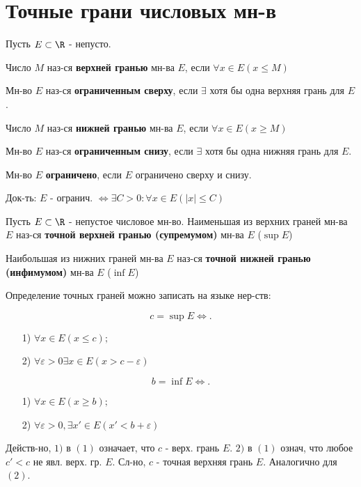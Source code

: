 \section{Точные грани числовых мн-в}
\begin{definition}
Пусть $E \subset \R$ - непусто.

Число $M$ наз-ся \textbf{верхней гранью} мн-ва $E$, если $\forall x \in E (x \leq M)$

Мн-во $E$ наз-ся \textbf{ограниченным сверху}, если $\exists $ хотя бы одна верхняя грань для $E$.

Число $M$ наз-ся \textbf{нижней гранью} мн-ва $E$, если $\forall x \in E (x \geq M)$

Мн-во $E$ наз-ся \textbf{ограниченным снизу}, если $\exists $ хотя бы одна нижняя грань для $E$.

Мн-во $E$ \textbf{ограничено}, если $E$ ограничено сверху и снизу.
\end{definition}
\begin{task}
Док-ть: $E \text{ - огранич. } \iff \exists C > 0 \colon  \forall x \in E (|x| \leq C)$
\end{task}

\begin{definition}
Пусть $E \subset \R$ - непустое числовое мн-во. Наименьшая из верхних граней мн-ва $E$ наз-ся \textbf{точной верхней гранью (супремумом)} мн-ва $E$ ($\sup E$)

Наибольшая из нижних граней мн-ва $E$ наз-ся \textbf{точной нижней гранью (инфимумом)} мн-ва $E$ ($\inf E$)
\end{definition}
\begin{note}
Определение точных граней можно записать на языке нер-ств:

\begin{equation}
    c = \sup E \iff
    .
\end{equation}
\begin{enumerate}
    \item [1) ] $\forall x \in E (x \leq c);$ 
    \item [2) ] $\forall  \varepsilon > 0  \exists  x \in E (x > c - \varepsilon)$
\end{enumerate}


\begin{equation}
b = \inf E \iff
.\end{equation} 
\begin{enumerate}
    \item [1) ] $\forall x \in E (x \geq b);$ 
    \item [2) ] $\forall \varepsilon > 0, \exists x' \in E (x' < b + \varepsilon)$
\end{enumerate}

Действ-но, $1)$ в $(1)$ означает, что $c$ - верх. грань $E$. $2)$ в $(1)$ означ, что любое $c' < c$ не явл. верх. гр. $E$. Сл-но, $c$ - точная верхняя грань $E$. Аналогично для  $(2)$.
\end{note}

